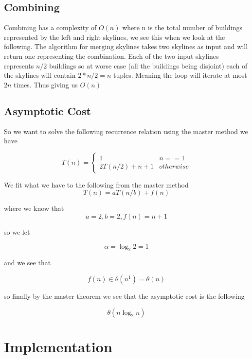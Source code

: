 \documentclass{article}
\begin{document}
		\subsection{Combining}		
		
		Combining has a complexity of $O(n)$ where n is the total number of buildings represented by the left and right skylines, we see this when we look at the following. The algorithm for merging skylines takes two skylines as input and will return one representing the combination. Each of the two input skylines represents $n/2$ buildings so at worse case (all the buildings being disjoint) each of the skylines will contain $2 * n/2 = n$ tuples. Meaning the loop will iterate at most $2n$ times. Thus giving us $O(n)$\newline
		
		\subsection{Asymptotic Cost}		
		
		So we want to solve the following recurrence relation using the master method we have\newline\newline
 
		\[ 
			T(n) = 
			\begin{cases}
				1 & n == 1\\
				2T(n/2) + n + 1 & otherwise
			\end{cases}
		\]\newline\newline
		
		We fit what we have to the following from the master method\newline
		\[
			T(n) = aT(n/b) + f(n)
		\]
		
		where we know that
		\[
			a = 2, b = 2, f(n) = n + 1
		\]
		
		so we let
		
		\[
			\alpha = \log_2 2 = 1
		\]		
			
		and we see that			
				
		\[
			f(n) \in \theta(n^1) = \theta(n)
		\]
		
		so finally by the master theorem we see that the asymptotic cost is the following 
		
		\[
			\theta(n\log_2 n)
		\]
		
	\section{Implementation}		
		
\end{document}
